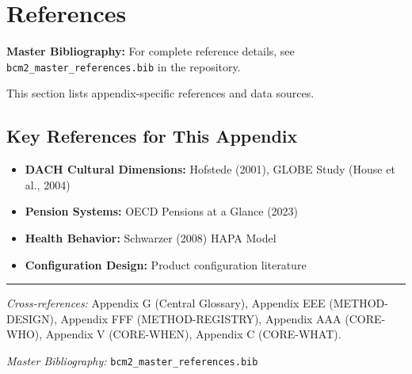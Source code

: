 \section{References}
\label{sec:ggg-references}

\begin{tcolorbox}[colback=blue!5!white, colframe=blue!75!black]
\textbf{Master Bibliography:} For complete reference details, see
\texttt{bcm2\_master\_references.bib} in the repository.

This section lists appendix-specific references and data sources.
\end{tcolorbox}

\vspace{0.5em}

\subsection{Key References for This Appendix}

\begin{itemize}[nosep]
    \item \textbf{DACH Cultural Dimensions:} Hofstede (2001), GLOBE Study (House et al., 2004)
    \item \textbf{Pension Systems:} OECD Pensions at a Glance (2023)
    \item \textbf{Health Behavior:} Schwarzer (2008) HAPA Model
    \item \textbf{Configuration Design:} Product configuration literature
\end{itemize}

\nocite{bcm_master}



\vspace{1em}
\hrule
\vspace{0.5em}

\noindent\textit{Cross-references:}
Appendix G (Central Glossary),
Appendix EEE (METHOD-DESIGN),
Appendix FFF (METHOD-REGISTRY),
Appendix AAA (CORE-WHO),
Appendix V (CORE-WHEN),
Appendix C (CORE-WHAT).

\noindent\textit{Master Bibliography:} \texttt{bcm2\_master\_references.bib}


